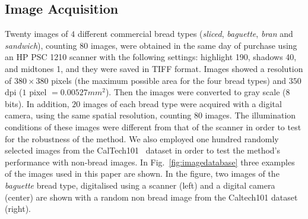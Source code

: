 \documentclass[a4paper,10pt]{article}
\begin{document}
\subsection{Image Acquisition}
Twenty images of $4$ different commercial bread types ({\em sliced}, {\em baguette}, {\em bran} and {\em sandwich}), counting $80$ images, were obtained in the same day of purchase using an HP PSC 1210 scanner with the following settings: highlight 190, shadows 40, and midtones 1, and they were saved in TIFF format. Images showed a resolution of $380 \times 380$ pixels (the maximum possible area for the four bread types) and $350$ dpi ($1$ pixel $= 0.00527 mm^{2}$). Then the images were converted to gray scale ($8$ bits). In addition, $20$ images of each bread type were acquired with a digital camera, using the same spatial resolution, counting $80$ images. The illumination conditions of these images were different from that of the scanner in order to test for the robustness of the method. We also employed one hundred randomly selected images from the CalTech101~\cite{FeiFei04} dataset in order to test the method's performance with non-bread images. In Fig.~\ref{fig:imagedatabase} three examples of the images used in this paper are shown. In the figure, two images of the {\em baguette} bread type, digitalised using a scanner (left) and a digital camera (center) are shown with a random non bread image from the Caltech101 dataset (right).
\end{document}
